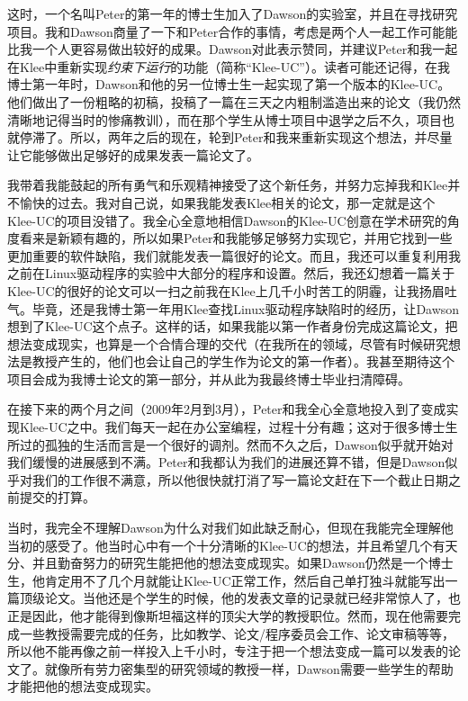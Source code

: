 \documentclass[letter,12pt]{book}
\begin{document}
\begin{CJK}{UTF8}{gbsn}
这时，一个名叫Peter的第一年的博士生加入了Dawson的实验室，并且在寻找研究项目。我和Dawson商量了一下和Peter合作的事情，考虑是两个人一起工作可能能比我一个人更容易做出较好的成果。Dawson对此表示赞同，并建议Peter和我一起在Klee中重新实现\emph{约束下运行}的功能（简称“Klee-UC”）。读者可能还记得，在我博士第一年时，Dawson和他的另一位博士生一起实现了第一个版本的Klee-UC。他们做出了一份粗略的初稿，投稿了一篇在三天之内粗制滥造出来的论文（我仍然清晰地记得当时的惨痛教训），而在那个学生从博士项目中退学之后不久，项目也就停滞了。所以，两年之后的现在，轮到Peter和我来重新实现这个想法，并尽量让它能够做出足够好的成果发表一篇论文了。

我带着我能鼓起的所有勇气和乐观精神接受了这个新任务，并努力忘掉我和Klee并不愉快的过去。我对自己说，如果我能发表Klee相关的论文，那一定就是这个Klee-UC的项目没错了。我全心全意地相信Dawson的Klee-UC创意在学术研究的角度看来是新颖有趣的，所以如果Peter和我能够足够努力实现它，并用它找到一些更加重要的软件缺陷，我们就能发表一篇很好的论文。而且，我还可以重复利用我之前在Linux驱动程序的实验中大部分的程序和设置。然后，我还幻想着一篇关于Klee-UC的很好的论文可以一扫之前我在Klee上几千小时苦工的阴霾，让我扬眉吐气。毕竟，还是我博士第一年用Klee查找Linux驱动程序缺陷时的经历，让Dawson想到了Klee-UC这个点子。这样的话，如果我能以第一作者身份完成这篇论文，把想法变成现实，也算是一个合情合理的交代（在我所在的领域，尽管有时候研究想法是教授产生的，他们也会让自己的学生作为论文的第一作者）。我甚至期待这个项目会成为我博士论文的第一部分，并从此为我最终博士毕业扫清障碍。

在接下来的两个月之间（2009年2月到3月），Peter和我全心全意地投入到了变成实现Klee-UC之中。我们每天一起在办公室编程，过程十分有趣；这对于很多博士生所过的孤独的生活而言是一个很好的调剂。然而不久之后，Dawson似乎就开始对我们缓慢的进展感到不满。Peter和我都认为我们的进展还算不错，但是Dawson似乎对我们的工作很不满意，所以他很快就打消了写一篇论文赶在下一个截止日期之前提交的打算。

当时，我完全不理解Dawson为什么对我们如此缺乏耐心，但现在我能完全理解他当初的感受了。他当时心中有一个十分清晰的Klee-UC的想法，并且希望几个有天分、并且勤奋努力的研究生能把他的想法变成现实。如果Dawson仍然是一个博士生，他肯定用不了几个月就能让Klee-UC正常工作，然后自己单打独斗就能写出一篇顶级论文。当他还是个学生的时候，他的发表文章的记录就已经非常惊人了，也正是因此，他才能得到像斯坦福这样的顶尖大学的教授职位。然而，现在他需要完成一些教授需要完成的任务，比如教学、论文/程序委员会工作、论文审稿等等，所以他不能再像之前一样投入上千小时，专注于把一个想法变成一篇可以发表的论文了。就像所有劳力密集型的研究领域的教授一样，Dawson需要一些学生的帮助才能把他的想法变成现实。


\end{CJK}
\end{document}
